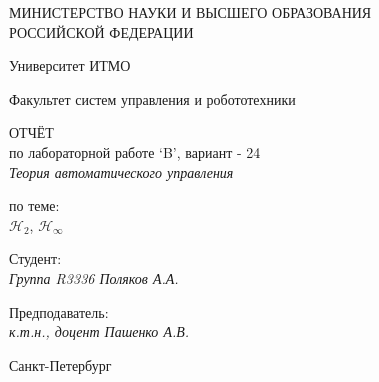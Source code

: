 \thispagestyle{empty}

\begin{center}
    МИНИСТЕРСТВО НАУКИ И ВЫСШЕГО ОБРАЗОВАНИЯ \\ РОССИЙСКОЙ ФЕДЕРАЦИИ

    \vspace{20pt}

    Университет ИТМО

    \vspace{20pt}

    Факультет систем управления и робототехники
\end{center}

\vfill
\begin{center}
    ОТЧЁТ \\  
    по лабораторной работе  `B', вариант - 24 \\ 
    \vspace{10pt}
    \textit{Теория автоматического управления}

    \vspace{20pt}

    по теме: \\
    \uppercase{\LARGE{$\mathcal{H}_2$, $\mathcal{H}_\infty$}}
\end{center}

\vfill

\noindent Студент: \\
\textit{Группа R3336 \hfill Поляков А.А.}


    \vspace{20pt}

    \noindent Предподаватель: \\
    \textit{к.т.н., доцент \hfill  Пашенко А.В.}

\vfill

\begin{center}
    Санкт-Петербург \\ \the\year
\end{center}